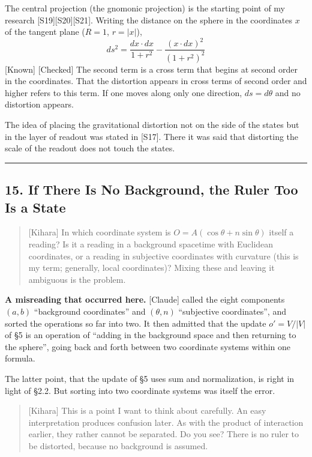 \documentclass[
  a4paper,
]{article}
\begin{document}
The central projection (the gnomonic projection) is the starting point
of my research {[}S19{]}{[}S20{]}{[}S21{]}. Writing the distance on the
sphere in the coordinates \(x\) of the tangent plane (\(R = 1\),
\(r = \lvert x\rvert\)), \[
ds^2 = \frac{dx\cdot dx}{1+r^2} - \frac{(x\cdot dx)^2}{(1+r^2)^2} \tag{14.2}
\] {[}Known{]} {[}Checked{]} The second term is a cross term that begins
at second order in the coordinates. That the distortion appears in cross
terms of second order and higher refers to this term. If one moves along
only one direction, \(ds = d\theta\) and no distortion appears.

The idea of placing the gravitational distortion not on the side of the
states but in the layer of readout was stated in {[}S17{]}. There it was
said that distorting the scale of the readout does not touch the states.

\begin{center}\rule{0.5\linewidth}{0.5pt}\end{center}

\subsection{15. If There Is No Background, the Ruler Too Is a
State}\label{if-there-is-no-background-the-ruler-too-is-a-state}

\begin{quote}
{[}Kihara{]} In which coordinate system is
\(O = A(\cos\theta + n\sin\theta)\) itself a reading? Is it a reading in
a background spacetime with Euclidean coordinates, or a reading in
subjective coordinates with curvature (this is my term; generally, local
coordinates)? Mixing these and leaving it ambiguous is the problem.
\end{quote}

\textbf{A misreading that occurred here.} {[}Claude{]} called the eight
components \((a, b)\) ``background coordinates'' and \((\theta, n)\)
``subjective coordinates'', and sorted the operations so far into two.
It then admitted that the update \(o' = V/\lvert V\rvert\) of §5 is an
operation of ``adding in the background space and then returning to the
sphere'', going back and forth between two coordinate systems within one
formula.

The latter point, that the update of §5 uses sum and normalization, is
right in light of §2.2. But sorting into two coordinate systems was
itself the error.

\begin{quote}
{[}Kihara{]} This is a point I want to think about carefully. An easy
interpretation produces confusion later. As with the product of
interaction earlier, they rather cannot be separated. Do you see? There
is no ruler to be distorted, because no background is assumed.
\end{quote}
\end{document}
